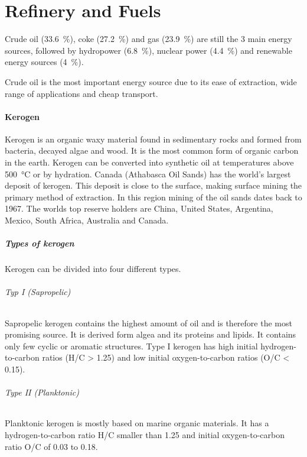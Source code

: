 \part{Refinery and Fuels}
Crude oil (\SI{33.6}{\percent}), coke (\SI{27.2}{\percent}) and gas (\SI{23.9}{\percent}) are still the 3 main energy sources, followed by hydropower (\SI{6.8}{\percent}), nuclear power (\SI{4.4}{\percent}) and renewable energy sources (\SI{4}{\percent}).

Crude oil is the most important energy source due to its ease of extraction, wide range of applications and cheap transport.

\subsection{Kerogen}
Kerogen is an organic waxy material found in sedimentary rocks and formed from bacteria, decayed algae and wood.
It is the most common form of organic carbon in the earth.
Kerogen can be converted into synthetic oil at temperatures above \SI{500}{\celsius} or by hydration.
Canada (Athabasca Oil Sands) has the world's largest deposit of kerogen.
This deposit is close to the surface, making surface mining the primary method of extraction.
In this region mining of the oil sands dates back to 1967.
The worlds top reserve holders are China, United States, Argentina, Mexico, South Africa, Australia and Canada.

\subsubsection{Types of kerogen}
Kerogen can be divided into four different types.

\paragraph{Typ I (Sapropelic)}
Sapropelic kerogen contains the highest amount of oil and is therefore the most promising source.
It is derived form algea and its proteins and lipids.
It contains only few cyclic or aromatic structures.
Type I kerogen has high initial hydrogen-to-carbon ratios (H/C > 1.25) and low initial oxygen-to-carbon ratios (O/C < 0.15).

\paragraph{Type II (Planktonic)}
Planktonic kerogen is mostly based on marine organic materials.
It has a hydrogen-to-carbon ratio H/C smaller than 1.25 and initial oxygen-to-carbon ratio O/C of 0.03 to 0.18.

